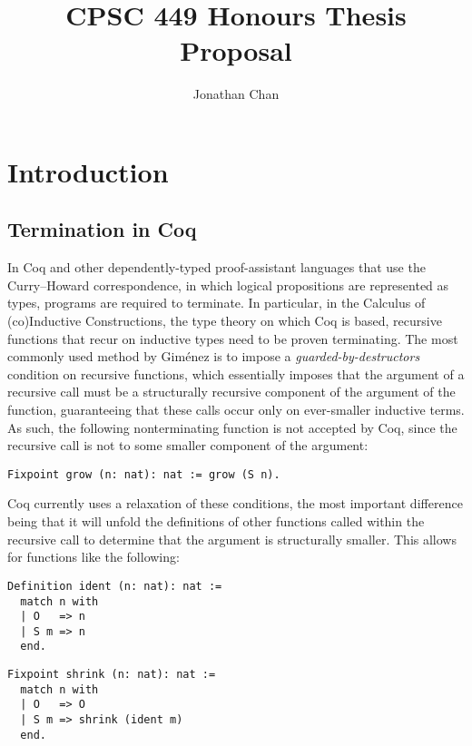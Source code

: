 \documentclass{article}
\title{CPSC 449 Honours Thesis Proposal}
\author{Jonathan Chan}
\date{}
\begin{document}
\maketitle

\section{Introduction}
\subsection{Termination in Coq} \label{coq_termination}
In Coq and other dependently-typed proof-assistant languages that use the Curry–Howard correspondence, in which logical propositions are represented as types, programs are required to terminate. In particular, in the Calculus of (co)Inductive Constructions, the type theory on which Coq is based, recursive functions that recur on inductive types need to be proven terminating. The most commonly used method by Giménez \cite{gimenez} is to impose a \textit{guarded-by-destructors} condition on recursive functions, which essentially imposes that the argument of a recursive call must be a structurally recursive component of the argument of the function, guaranteeing that these calls occur only on ever-smaller inductive terms. As such, the following nonterminating function is not accepted by Coq, since the recursive call is not to some smaller component of the argument:

\begin{verbatim}
Fixpoint grow (n: nat): nat := grow (S n).
\end{verbatim}

Coq currently uses a relaxation of these conditions, the most important difference being that it will unfold the definitions of other functions called within the recursive call to determine that the argument is structurally smaller. This allows for functions like the following:

\begin{multicols}{2}
\begin{verbatim}
Definition ident (n: nat): nat :=
  match n with
  | O   => n
  | S m => n
  end.
\end{verbatim}
\begin{verbatim}
Fixpoint shrink (n: nat): nat :=
  match n with
  | O   => O
  | S m => shrink (ident m)
  end.
\end{verbatim}
\end{multicols}
\end{document}
